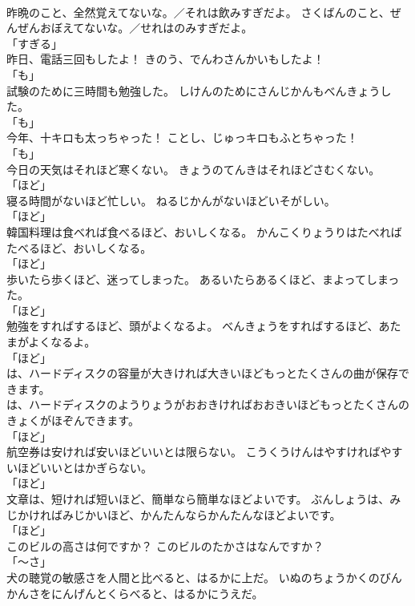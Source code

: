 \documentclass[8pt]{extreport}
\begin{document}
\begin{CJK}{UTF8}{min}
\\	昨晩のこと、全然覚えてないな。／それは飲みすぎだよ。	さくばんのこと、ぜんぜんおぼえてないな。／せれはのみすぎだよ。	
\\	「すぎる」	
\\	昨日、電話三回もしたよ！	きのう、でんわさんかいもしたよ！	
\\	「も」 
\\	試験のために三時間も勉強した。	しけんのためにさんじかんもべんきょうした。	
\\	「も」 
\\	今年、十キロも太っちゃった！	ことし、じゅっキロもふとちゃった！	
\\	「も」 
\\	今日の天気はそれほど寒くない。	きょうのてんきはそれほどさむくない。	
\\	「ほど」 
\\	寝る時間がないほど忙しい。	ねるじかんがないほどいそがしい。	
\\	「ほど」 
\\	韓国料理は食べれば食べるほど、おいしくなる。	かんこくりょうりはたべればたべるほど、おいしくなる。	
\\	「ほど」 
\\	歩いたら歩くほど、迷ってしまった。	あるいたらあるくほど、まよってしまった。	
\\	「ほど」 
\\	勉強をすればするほど、頭がよくなるよ。	べんきょうをすればするほど、あたまがよくなるよ。	
\\	「ほど」 
\\	は、ハードディスクの容量が大きければ大きいほどもっとたくさんの曲が保存できます。	
\\	は、ハードディスクのようりょうがおおきければおおきいほどもっとたくさんのきょくがほぞんできます。	
\\	「ほど」 
\\	航空券は安ければ安いほどいいとは限らない。	こうくうけんはやすければやすいほどいいとはかぎらない。	
\\	「ほど」 
\\	文章は、短ければ短いほど、簡単なら簡単なほどよいです。	ぶんしょうは、みじかければみじかいほど、かんたんならかんたんなほどよいです。	
\\	「ほど」 
\\	このビルの高さは何ですか？	このビルのたかさはなんですか？	
\\	「～さ」 
\\	犬の聴覚の敏感さを人間と比べると、はるかに上だ。	いぬのちょうかくのびんかんさをにんげんとくらべると、はるかにうえだ。	

\end{CJK}
\end{document}
